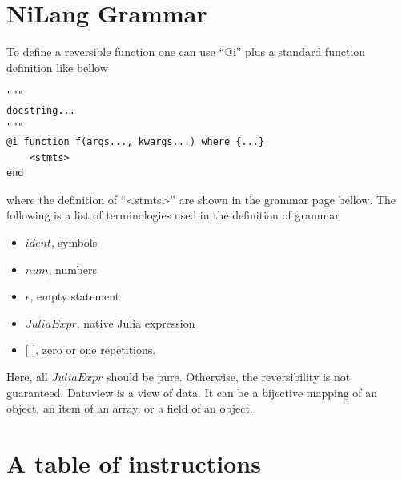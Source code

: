 \documentclass{article}
\newcommand{\<}{\langle}
\renewcommand{\>}{\rangle}
\theoremstyle{definition}\newtheorem{definition}{\textit{Definition}}
\begin{document}



\newpage
\appendix

\section{NiLang Grammar}\label{app:grammar}

To define a reversible function one can use ``@i'' plus a standard function definition like bellow

\begin{minipage}{.88\columnwidth}
\begin{lstlisting}[basicstyle=\small\ttfamily,columns=fullflexible]
"""
docstring...
"""
@i function f(args..., kwargs...) where {...}
    <stmts>
end
\end{lstlisting}
\end{minipage}
where the definition of ``<stmts>'' are shown in the grammar page bellow.
The following is a list of terminologies used in the definition of grammar
\begin{itemize}
    \item $ident$, symbols
    \item $num$, numbers
    \item $\epsilon$, empty statement
    \item $JuliaExpr$, native Julia expression
    \item $[$ $]$,  zero or one repetitions.
\end{itemize}
Here, all $JuliaExpr$ should be pure. Otherwise, the reversibility is not guaranteed.
Dataview is a view of data. It can be a bijective mapping of an object, an item of an array, or a field of an object.

\newpage

\begin{minipage}{0.6\textwidth}
    \small

\end{minipage}

\newpage
\section{A table of instructions}\label{app:instr}
\end{document}
